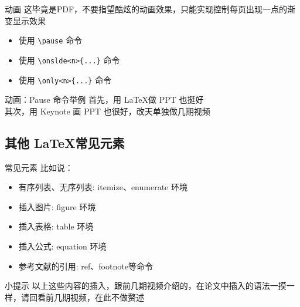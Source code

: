 \documentclass[AutoFakeBold,AutoFakeSlant]{beamer}
\begin{document}
\begin{frame}[fragile]{动画}
这毕竟是PDF，不要指望酷炫的动画效果，只能实现控制每页出现一点的渐变显示效果
\vspace{1em}
    \begin{itemize}
        \item 使用 \verb|\pause| 命令
        \item 使用 \verb|\onslde<n>{...}| 命令
        \item 使用 \verb|\only<n>{...}| 命令
    \end{itemize}
\end{frame}

\begin{frame}{动画：Pause 命令举例}
首先，用 \LaTeX 做 PPT 也挺好\\
\vspace{1em}
\pause
其次，用 Keynote 画 PPT 也很好，改天单独做几期视频 \\
\end{frame}



\subsection{其他 \LaTeX 常见元素}
\begin{frame}{常见元素}
比如说：
    \begin{itemize}
        \item 有序列表、无序列表: itemize、enumerate 环境
        \item 插入图片: figure 环境
        \item 插入表格: table 环境
        \item 插入公式: equation 环境
        \item 参考文献的引用: ref、footnote等命令
    \end{itemize}
    \vspace{1em}
    \begin{block}{小提示}
    以上这些内容的插入，跟前几期视频介绍的，在论文中插入的语法一摸一样，请回看前几期视频，在此不做赘述 \\ 
    \end{block}
\end{frame}
\end{document}
